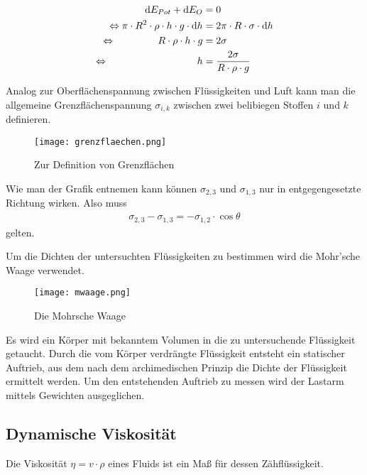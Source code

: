 \documentclass[12pt, a4paper, twoside]{scrartcl}
\begin{document}
\begin{align*}
\textup dE_{Pot}+\textup dE_{O}&=0 \\
\Leftrightarrow\pi\cdot R^2\cdot\rho\cdot h \cdot g\cdot\textup dh&=2\pi\cdot R\cdot\sigma\cdot\textup dh \\
\Leftrightarrow\hspace{1.5cm} R\cdot\rho\cdot h\cdot g&=2\sigma \\
\Leftrightarrow\hspace{3.15cm} h&=\frac{2\sigma}{R\cdot\rho\cdot g}
\end{align*}\newline

Analog zur Oberflächenspannung zwischen Flüssigkeiten und Luft kann man die allgemeine Grenzflächenspannung $\sigma_{i,k}$ zwischen zwei belibiegen Stoffen $i$ und $k$ definieren.
\begin{figure} [h]
\centering
\texttt{[image: grenzflaechen.png]}
\caption{Zur Definition von Grenzflächen\protect\footnotemark}
\end{figure}

Wie man der Grafik entnemen kann können $\sigma_{2,3}$ und $\sigma_{1,3}$ nur in entgegengesetzte Richtung wirken. Also muss
\begin{align*}
 \sigma_{2,3}-\sigma_{1,3}=-\sigma_{1,2}\cdot\cos\theta
\end{align*}
gelten.\newline

Um die Dichten der untersuchten Flüssigkeiten zu bestimmen wird die Mohr'sche Waage verwendet.

\begin{figure} [h]
\centering
\texttt{[image: mwaage.png]}
\caption{Die Mohrsche Waage\protect\footnotemark}
\end{figure}

Es wird ein Körper mit bekanntem Volumen in die zu untersuchende Flüssigkeit getaucht. Durch die vom Körper verdrängte Flüssigkeit entsteht ein statischer Auftrieb, aus dem nach dem archimedischen Prinzip die Dichte der Flüssigkeit ermittelt werden. Um den entstehenden Auftrieb zu messen wird der Lastarm mittels Gewichten ausgeglichen.



\subsection{Dynamische Viskosität}
Die Viskosität $\eta=v\cdot\rho$ eines Fluids ist ein Maß für dessen Zähflüssigkeit.\linebreak
\end{document}
